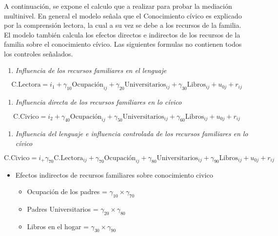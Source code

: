 \documentclass[12pt,twoside]{templates/facsothesis}
\providecommand{\tightlist}{%
  \setlength{\itemsep}{0pt}\setlength{\parskip}{0pt}}
\begin{document}
A continuación, se expone el calculo que a realizar para probar la mediación multinivel. En general el modelo señala que el Conocimiento cívico es explicado por la comprensión lectora, la cual a su vez se debe a los recursos de la familia. El modelo también calcula los efectos directos e indirectos de los recursos de la familia sobre el conocimiento cívico. Las siguientes formulas no contienen todos los controles señalados.

\begin{enumerate}
\def\labelenumi{\alph{enumi})}
\tightlist
\item
  \emph{Influencia de los recursos familiares en el lenguaje}
\end{enumerate}

\begin{equation}
\text{C.Lectora}= i_1 +\gamma_{10}\text{Ocupación}_{ij} + \gamma_{20}\text{Universitarios}_{ij}+ \gamma_{30}\text{Libros}_{ij}+u_{0j}+r_{ij}
\end{equation}

\begin{enumerate}
\def\labelenumi{\alph{enumi})}
\setcounter{enumi}{1}
\tightlist
\item
  \emph{Influencia directa de los recursos familiares en lo cívico}
\end{enumerate}

\begin{equation}
\text{C.Civico}= i_2+\gamma_{40}\text{Ocupación}_{ij} + \gamma_{50}\text{Universitarios}_{ij}+ \gamma_{60}\text{Libros}_{ij}+u_{0j}+r_{ij}
\end{equation}

\begin{enumerate}
\def\labelenumi{\alph{enumi})}
\setcounter{enumi}{2}
\tightlist
\item
  \emph{Influencia del lenguaje e influencia controlada de los recursos familiares en lo cívico}
\end{enumerate}

\begin{equation}
\text{C.Civico}= i_+\gamma_{70}\text{C.Lectora}_{ij}+\gamma_{70}\text{Ocupación}_{ij} + \gamma_{80}\text{Universitarios}_{ij}+ \gamma_{90}\text{Libros}_{ij}+u_{0j}+r_{ij}
\end{equation}

\begin{itemize}
\item
  Efectos indirectos de recursos familiares sobre conocimiento civico

  \begin{itemize}
  \item
    Ocupación de los padres = \(\gamma_{10}\times\gamma_{70}\)
  \item
    Padres Universitarios = \(\gamma_{20}\times\gamma_{80}\)
  \item
    Libros en el hogar = \(\gamma_{30}\times\gamma_{90}\)
  \end{itemize}
\end{itemize}
\end{document}
